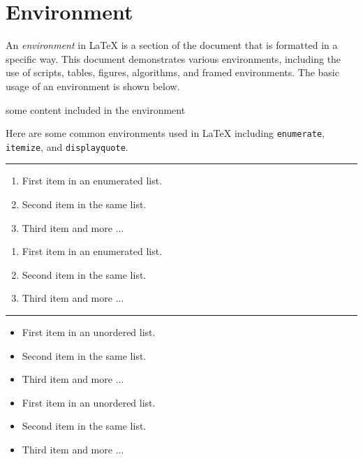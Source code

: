 \section{Environment}

An \emph{environment} in {\LaTeX} is a section of the document that is formatted in a specific way. 
This document demonstrates various environments, including the use of scripts, tables, figures, algorithms, and framed environments.
The basic usage of an environment is shown below.

\begin{latexcode}
\begin{environment}
  some content included in the environment
\end{environment}
\end{latexcode}

Here are some common environments used in {\LaTeX} including \verb|enumerate|, \verb|itemize|, and \verb|displayquote|.

\noindent\rule{\linewidth}{0.5pt}

\begin{multicols}{2}
  \begin{enumerate}
    \item First item in an enumerated list.
    \item Second item in the same list.
    \item Third item and more ...
  \end{enumerate}
  \begin{latexcode}
\begin{enumerate}
  \item First item in an enumerated list.
  \item Second item in the same list.
  \item Third item and more ...
\end{enumerate}
  \end{latexcode}
\end{multicols}

\noindent\rule{\linewidth}{0.5pt}

\begin{multicols}{2}
  \begin{itemize}
    \item First item in an unordered list.
    \item Second item in the same list.
    \item Third item and more ...
  \end{itemize}
  \begin{latexcode}
\begin{itemize}
  \item First item in an unordered list.
  \item Second item in the same list.
  \item Third item and more ...
\end{itemize}
  \end{latexcode}
\end{multicols}

